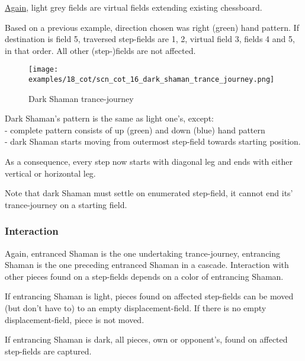\hyperref[fig:scn_hd_04_centaur_off_board]{Again},
light grey fields are virtual fields extending existing chessboard.

Based on a previous example, direction chosen was right (green) hand pattern.
If destination is field 5, traversed step-fields are 1, 2, virtual field 3,
fields 4 and 5, in that order. All other (step-)fields are not affected.

\clearpage %

\noindent
\begin{figure}[!h]
\texttt{[image: examples/18\_cot/scn\_cot\_16\_dark\_shaman\_trance\_journey.png]}
\caption{Dark Shaman trance-journey}
\label{fig:scn_cot_16_dark_shaman_trance_journey}
\end{figure}

Dark Shaman's pattern is the same as light one's, except: \\
- complete pattern consists of up (green) and down (blue) hand pattern \\
- dark Shaman starts moving from outermost step-field towards starting position.

As a consequence, every step now starts with diagonal leg and ends with either
vertical or horizontal leg.


Note that dark Shaman must settle on enumerated step-field, it cannot end its'
trance-journey on a starting field.

\subsubsection*{Interaction}

Again, entranced Shaman is the one undertaking trance-journey, entrancing Shaman
is the one preceding entranced Shaman in a cascade. Interaction with other pieces
found on a step-fields depends on a color of entrancing Shaman.

If entrancing Shaman is light, pieces found on affected step-fields can be moved
(but don't have to) to an empty displacement-field. If there is no empty
displacement-field, piece is not moved.

If entrancing Shaman is dark, all pieces, own or opponent's, found on affected
step-fields are captured.


